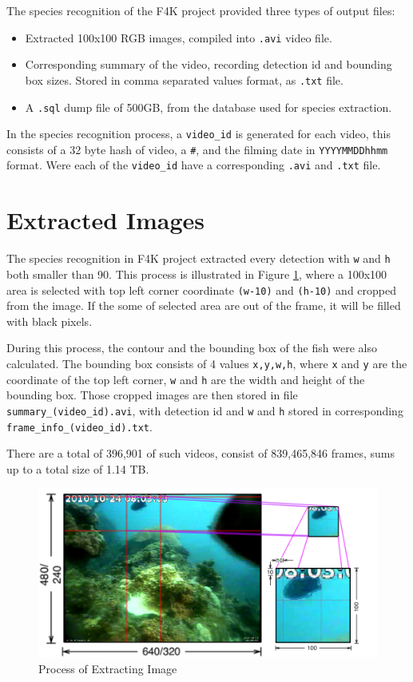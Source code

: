 \documentclass[bsc,logo,twoside,fullspacing,parskip]{infthesis}
\begin{document}
The species recognition of the F4K project provided three types of output files:
\begin{itemize}
\setlength{\parskip}{1pt}
\item
Extracted 100x100 RGB images, compiled into {\tt .avi} video file.
\item
Corresponding summary of the video, recording detection id and bounding box sizes. Stored in comma separated values format, as {\tt .txt} file.
\item
A {\tt .sql} dump file of 500GB, from the database used for species extraction.
\end{itemize}

In the species recognition process, a {\tt video\_id} is generated for each video, this consists of a 32 byte hash of video, a {\tt \#}, and the filming date in {\tt YYYYMMDDhhmm} format. Were each of the {\tt video\_id} have a corresponding {\tt .avi} and {\tt .txt} file.

\section{Extracted Images}
\label{sec:summaries}

The species recognition in F4K project extracted every detection with {\tt w} and {\tt h} both smaller than 90. 
This process is illustrated in Figure \ref{fig:extraction}, where a 100x100 area is selected with top left corner coordinate {\tt (w-10)} and {\tt (h-10)} and cropped from the image.
If the some of selected area are out of the frame, it will be filled with black pixels.

During this process, the contour and the bounding box of the fish were also calculated.
The bounding box consists of 4 values {\tt x,y,w,h}, where {\tt x} and {\tt y} are the coordinate of the top left corner, {\tt w} and {\tt h} are the width and height of the bounding box. 
Those cropped images are then stored in file {\tt summary\_(video\_id).avi}, with detection id and {\tt w} and {\tt h} stored in corresponding {\tt frame\_info\_(video\_id).txt}.

There are a total of 396,901 of such videos, consist of 839,465,846 frames, sums up to a total size of 1.14 TB.

\begin{figure}
    \centering
    \includegraphics[scale=0.3]{graph/extraction.png}
    \caption{Process of Extracting Image}
    \label{fig:extraction}
\end{figure}
\end{document}
